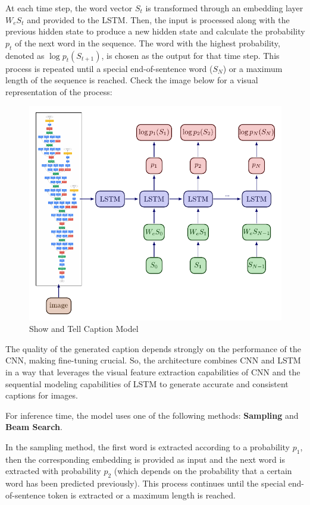 At each time step, the word vector $S_t$ is transformed through an embedding layer $W_e S_t$ and provided to the LSTM. Then, the input is processed along with the previous hidden state to produce a new hidden state and calculate the probability $p_t$ of the next word in the sequence. The word with the highest probability, denoted as $\log p_t(S_{t+1})$, is chosen as the output for that time step. This process is repeated until a special end-of-sentence word ($S_N$) or a maximum length of the sequence is reached. Check the image below for a visual representation of the process:
\newpage

\begin{figure}[!htbp]
    \centering
    \includegraphics[width=\linewidth]{tikz/chapter7 - Show and Tell Model.pdf}
    \caption{Show and Tell Caption Model}
\end{figure}

The quality of the generated caption depends strongly on the performance of the CNN, making fine-tuning crucial. So, the architecture combines CNN and LSTM in a way that leverages the visual feature extraction capabilities of CNN and the sequential modeling capabilities of LSTM to generate accurate and consistent captions for images.

For inference time, the model uses one of the following methods: \textbf{Sampling} and \textbf{Beam Search}.

In the sampling method, the first word is extracted according to a probability $p_1$, then the corresponding embedding is provided as input and the next word is extracted with probability $p_2$ (which depends on the probability that a certain word has been predicted previously). This process continues until the special end-of-sentence token is extracted or a maximum length is reached.

